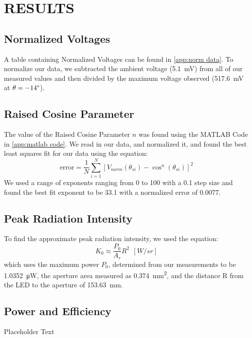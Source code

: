 \section{RESULTS}

\subsection{Normalized Voltages}
A table containing Normalized Voltages can be found in \autoref{app:norm data}. To normalize our data, we subtracted the ambient voltage (\SI{5.1}{\milli\volt}) from all of our measured values and then divided by the maximum voltage observed (\SI{517.6}{\milli\volt} at $\theta = -14\degree$).
\subsection{Raised Cosine Parameter}
The value of the Raised Cosine Parameter $n$ was found using the MATLAB Code in \autoref{app:matlab code}. We read in our data, and normalized it, and found the best least squares fit for our data using the equation:
\[\text{error} = \frac{1}{N}\sum_{i=1}^{N}[V_{norm}(\theta_{si}) - \cos^{n}(\theta_{si})]^{2}\]
We used a range of exponents ranging from 0 to 100 with a 0.1 step size and found the best fit exponent to be 33.1 with a normalized error of 0.0077.

\subsection{Peak Radiation Intensity}
To find the approximate peak radiation intensity, we used the equation:
\[K_{0}\approx \frac{P_{0}}{A_{r}}R^{2}\: \: [W/sr]\]
which uses the maximum power $P_0$, determined from our measurements to be \SI{1.0352}{\micro\watt}, the aperture area measured as \SI{0.374}{mm^2}, and the distance R from the LED to the aperture of \SI{153.63}{mm}. 
\subsection{Power and Efficiency}
Placeholder Text


